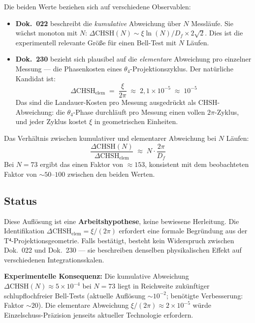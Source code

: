 Die beiden Werte beziehen sich auf verschiedene Observablen:

\begin{itemize}
  \item \textbf{Dok.~022} beschreibt die \emph{kumulative} Abweichung
        über $N$ Messläufe. Sie wächst monoton mit $N$:
        $\Delta\text{CHSH}(N) \sim \xi\ln(N)/D_f \times 2\sqrt{2}$.
        Dies ist die experimentell relevante Größe für einen Bell-Test
        mit $N$ Läufen.

  \item \textbf{Dok.~230} bezieht sich plausibel auf die
        \emph{elementare} Abweichung pro einzelner Messung — die
        Phasenkosten eines $\theta_4$-Projektionszyklus. Der natürliche
        Kandidat ist:
        \begin{equation}
          \Delta\text{CHSH}_\text{elem}
          \;=\; \frac{\xi}{2\pi}
          \;\approx\; 2{,}1\times10^{-5}
          \;\approx\; 10^{-5}
          \tag{190.21}
        \end{equation}
        Das sind die Landauer-Kosten pro Messung ausgedrückt als
        CHSH-Abweichung: die $\theta_4$-Phase durchläuft pro Messung
        einen vollen $2\pi$-Zyklus, und jeder Zyklus kostet $\xi$
        in geometrischen Einheiten.
\end{itemize}

Das Verhältnis zwischen kumulativer und elementarer Abweichung bei $N$ Läufen:
\begin{equation}
  \frac{\Delta\text{CHSH}(N)}{\Delta\text{CHSH}_\text{elem}}
  \;\approx\; N\cdot\frac{2\pi}{D_f}
  \tag{190.22}
\end{equation}
Bei $N=73$ ergibt das einen Faktor von $\approx 153$, konsistent mit
dem beobachteten Faktor von $\sim50$--$100$ zwischen den beiden Werten.

\subsection*{Status}

Diese Auflösung ist eine \textbf{Arbeitshypothese}, keine bewiesene Herleitung.
Die Identifikation $\Delta\text{CHSH}_\text{elem} = \xi/(2\pi)$ erfordert
eine formale Begründung aus der T⁴-Projektionsgeometrie. Falls bestätigt,
besteht kein Widerspruch zwischen Dok.~022 und Dok.~230 — sie beschreiben
denselben physikalischen Effekt auf verschiedenen Integrationsskalen.

\textbf{Experimentelle Konsequenz:} Die kumulative Abweichung
$\Delta\text{CHSH}(N) \approx 5\times10^{-4}$ bei $N=73$ liegt
in Reichweite zukünftiger schlupflochfreier Bell-Tests
(aktuelle Auflösung $\sim10^{-2}$; benötigte Verbesserung: Faktor $\sim20$).
Die elementare Abweichung $\xi/(2\pi) \approx 2\times10^{-5}$ würde
Einzelschuss-Präzision jenseits aktueller Technologie erfordern.

